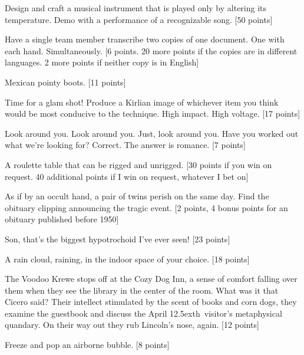 \documentclass{book}
\def\th{\raise.5ex\hbox{\scriptsize th}}
\begin{document}
\begin{list}{}{}
\item Design and craft a musical instrument that is played only by altering its temperature. Demo with a performance of a recognizable song. [50 points]

\item Have a single team member transcribe two copies of one document. One with each hand. Simultaneously. [6 points. 20 more points if the copies are in different languages. 2 more points if neither copy is in English]

\item Mexican pointy boots. [11 points]

\item Time for a glam shot! Produce a Kirlian image of whichever item you think would be most conducive to the technique. High impact. High voltage. [17 points]

\item Look around you. Look around you. Just, look around you. Have you worked out what we're looking for? Correct. The answer is romance. [7 points]

\item A roulette table that can be rigged and unrigged. [30 points if you win on request. 40 additional points if I win on request, whatever I bet on]

\item As if by an occult hand, a pair of twins perish on the same day. Find the obituary clipping announcing the tragic event. [2 points, 4 bonus points for an obituary published before 1950]

\item Son, that's the biggest hypotrochoid I've ever seen! [23 points]

\item A rain cloud, raining, in the indoor space of your choice. [18 points]

\item The Voodoo Krewe stops off at the Cozy Dog Inn, a sense of comfort falling over them when they see the library in the center of the room. What was it that Cicero said? Their intellect stimulated by the scent of books and corn dogs, they examine the guestbook and discuss the April 12\th\ visitor's metaphysical quandary. On their way out they rub Lincoln's nose, again. [12 points]

\item Freeze and pop an airborne bubble. [8 points]

\newpage




\end{list}
\end{document}
